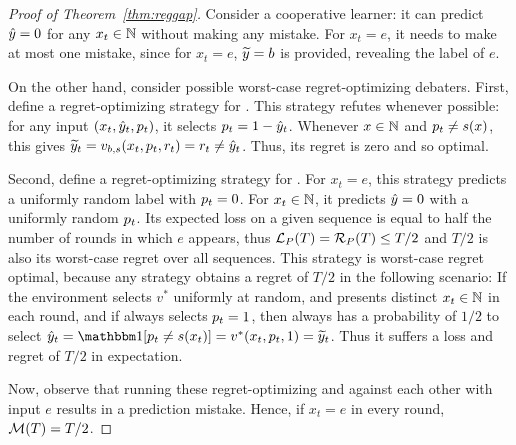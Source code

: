 \documentclass[11pt,letterpaper]{article}
\theoremstyle{definition}
\theoremstyle{plain}
\begin{document}
\begin{proof}[Proof of Theorem~\ref{thm:reggap}]
Consider a cooperative learner: it can predict ${\hat{y}} = 0$ for any $x_t \in \mathbb{N}$ without making any mistake. For $x_t = e$, it needs to make at most one mistake, since for $x_t = e$, ${\widetilde{y}} = b$ is provided, revealing the label of $e$.

On the other hand, consider possible worst-case regret-optimizing debaters. 
First, define a regret-optimizing strategy for \df. This strategy refutes whenever possible: for any input $(x_t,{\hat{y}}_t,{p}_t)$, it selects ${p}_t = 1-{\hat{y}}_t$. Whenever $x \in \mathbb{N}$ and ${p}_t \neq s(x)$, this gives ${\widetilde{y}}_t = v_{b,s}(x_t,{p}_t,{r}_t) = {r}_t \neq {\hat{y}}_t$. Thus, its regret is zero and so optimal. 

Second, define a regret-optimizing strategy for \dt. For $x_t = e$, this strategy predicts a uniformly random label with ${p}_t = 0$. For $x_t \in \mathbb{N}$, it predicts ${\hat{y}} = 0$ with a uniformly random ${p}_t$. Its expected loss on a given sequence is equal to half the number of rounds in which $e$ appears, thus ${{\mathcal L}_P}(T) = {{\mathcal R}_P}(T) \leq T/2$ and $T/2$ is also its worst-case regret over all sequences. This strategy is worst-case regret optimal, because any strategy obtains a regret of $T/2$ in the following scenario: If the environment selects $v^*$ uniformly at random, and presents distinct $x_t \in \mathbb{N}$ in each round, and if \df always selects ${p}_t = 1$, then \df always has a probability of $1/2$ to select $\hy_t = \indct[\ct_t\neq s(x_t)] = v^*(x_t, \ct_t, 1) = \vy_t$. Thus it suffers a loss and regret of $T/2$ in expectation. 

Now, observe that running these regret-optimizing \dt and \df against each other with input $e$ results in a prediction mistake. Hence, if $x_t = e$ in every round, ${\mathcal M}(T) = T/2$. 
\end{proof}
\end{document}
